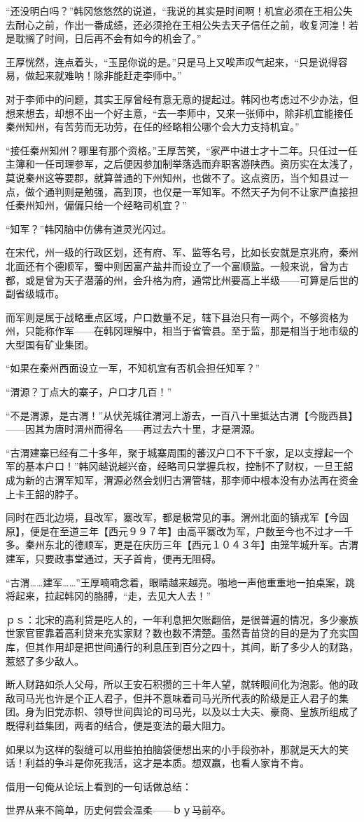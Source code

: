 “还没明白吗？”韩冈悠悠然的说道，“我说的其实是时间啊！机宜必须在王相公失去耐心之前，作出一番成绩，还必须抢在王相公失去天子信任之前，收复河湟！若是耽搁了时间，日后再不会有如今的机会了。”

王厚恍然，连点着头，“玉昆你说的是。”只是马上又唉声叹气起来，“只是说得容易，做起来就难呐！除非能赶走李师中。”

对于李师中的问题，其实王厚曾经有意无意的提起过。韩冈也考虑过不少办法，但想来想去，却想不出一个好主意，“去一李师中，又来一张师中，除非机宜能接任秦州知州，有苦劳而无功劳，在任的经略相公哪个会大力支持机宜。”

“接任秦州知州？哪里有那个资格。”王厚苦笑，“家严中进士才十二年。只任过一任主簿和一任司理参军，之后便因参加制举落选而弃职客游陕西。资历实在太浅了，莫说秦州这等要郡，就算普通的下州知州，也做不了。这点资历，当个知县过一点，做个通判则是勉强，高到顶，也仅是一军知军。不然天子为何不让家严直接担任秦州知州，偏偏只给一个经略司机宜？”

“知军？”韩冈脑中仿佛有道灵光闪过。

在宋代，州一级的行政区划，还有府、军、监等名号，比如长安就是京兆府，秦州北面还有个德顺军，蜀中则因富产盐井而设立了一个富顺监。一般来说，曾为古都，或是曾为天子潜藩的州，会升格为府，通常比州要高上半级——可算是后世的副省级城市。

而军则是属于战略重点区域，户口数量不足，辖下县治只有一两个，不够资格为州，只能称作军——在韩冈理解中，相当于省管县。至于监，那是相当于地市级的大型国有矿业集团。

“如果在秦州西面设立一军，不知机宜有否机会担任知军？”

“渭源？丁点大的寨子，户口才几百！”

“不是渭源，是古渭！”从伏羌城往渭河上游去，一百八十里抵达古渭【今陇西县】——因其为唐时渭州而得名——再过去六十里，才是渭源。

“古渭建寨已经有二十多年，聚于城寨周围的蕃汉户口不下千家，足以支撑起一个军的基本户口！”韩冈越说越兴奋，经略司只掌握兵权，控制不了财权，一旦王韶成为新的古渭军知军，渭源必然会划归古渭管辖，那李师中根本没有办法再在资金上卡王韶的脖子。

同时在西北边境，县改军，寨改军，都是极常见的事。渭州北面的镇戎军【今固原】，便是在至道三年【西元９９７年】由高平寨改为军，户数至今也不过才一千多。秦州东北的德顺军，更是在庆历三年【西元１０４３年】由笼竿城升军。古渭建军，只要政事堂通过，天子首肯，便再无阻碍。

“古渭……建军……”王厚喃喃念着，眼睛越来越亮。啪地一声他重重地一拍桌案，跳将起来，拉起韩冈的胳膊，“走，去见大人去！”

ｐｓ：北宋的高利贷是吃人的，一年利息把欠账翻倍，是很普遍的情况，多少豪族世家官宦靠着高利贷来充实家财？数也数不清楚。虽然青苗贷的目的是为了充实国库，但其作用却是把世间通行的利息压到百分之四十，其间，断了多少人的财路，惹怒了多少敌人。

断人财路如杀人父母，所以王安石积攒的三十年人望，就转眼间化为泡影。他的政敌司马光也许是个正人君子，但并不意味着司马光所代表的阶级是正人君子的集团。身为旧党赤帜、领导世间舆论的司马光，以及以士大夫、豪商、皇族所组成了既得利益集团，两者的结合，便是变法的最大阻力。

如果以为这样的裂缝可以用些拍拍脑袋便想出来的小手段弥补，那就是天大的笑话！利益的争斗是你死我活，这才是本质。想双赢，也看人家肯不肯。

借用一句俺从论坛上看到的一句话做总结：

世界从来不简单，历史何尝会温柔——ｂｙ马前卒。

